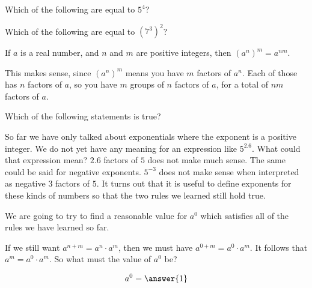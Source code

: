 \documentclass{ximera}
\begin{document}
\begin{question}
	Which of the following are equal to $5^4$?
	\begin{selectAll}
	\end{selectAll}
\end{question}

\begin{question}
	Which of the following are equal to $(7^3)^2$?
	\begin{selectAll}
		\choice{$7^5$}
		\choice[correct]{$(7^3) \cdot (7^3)$}
		\choice[correct]{$7^6$}
		\choice{$7\cdot 7 \cdot 7 \cdot 7 \cdot 7$}
	\end{selectAll}
\end{question}

\begin{theorem}
	If $a$ is a real number, and $n$ and $m$ are positive integers, then $(a^n)^m = a^{nm}$.
\end{theorem}



This makes sense, since $(a^n)^m$ means you have $m$ factors of $a^n$.  Each of those has $n$ factors of $a$, so you have $m$ groups of $n$ factors of $a$, for a total of $nm$ factors of $a$.

\begin{question}
	Which of the following statements is true?
	\begin{multipleChoice}
	\end{multipleChoice}
\end{question}

So far we have only talked about exponentials where the exponent is a positive integer.  We do not yet have any meaning for an expression like $5^{2.6}$.  What could that expression mean?  $2.6$ factors of $5$ does not make much sense.  The same could be said for negative exponents.  $5^{-3}$ does not make sense when interpreted as negative $3$ factors of $5$.  It turns out that it is useful to define exponents for these kinds of numbers so that the two rules we learned still hold true.

\begin{question}
	We are going to try to find a reasonable value for $a^0$ which satisfies all of the rules we have learned so far.
	
If we still want $a^{n+m} = a^n \cdot a^m$, then we must have $a^{0+m} = a^0\cdot a^m$.  It follows that $a^m = a^0 \cdot a^m$.  So what must the value of $a^0$ be?

\[a^0 = \answer{1}\]

\end{question}
\end{document}
